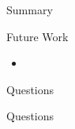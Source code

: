\documentclass[style=unh]{powerdot}
\begin{document}

\begin{slide}{Summary}
  
\end{slide}


\begin{slide}{Future Work}
  \begin{itemize}
  \item 
  \end{itemize}
\end{slide}


\begin{slide}{Questions}
\end{slide}{Questions}

\end{document}
